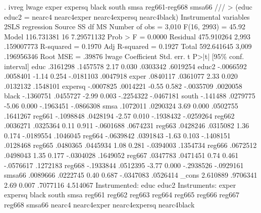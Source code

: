 . ivreg lwage exper expersq black south smsa reg661-reg668 smsa66 ///
> (educ educ2 = nearc4 nearc4exper nearc4expersq nearc4black)
{\smallskip}
Instrumental variables 2SLS regression
{\smallskip}
      Source {\VBAR}       SS           df       MS      Number of obs   =     3,010
   F(16, 2993)     =     45.92
       Model {\VBAR}  116.731381        16  7.29571132   Prob > F        =    0.0000
    Residual {\VBAR}  475.910264     2,993  .159007773   R-squared       =    0.1970
   Adj R-squared   =    0.1927
       Total {\VBAR}  592.641645     3,009  .196956346   Root MSE        =    .39876
{\smallskip}
       lwage {\VBAR} Coefficient  Std. err.      t    P>|t|     [95\% conf. interval]
        educ {\VBAR}   .3161298   .1457578     2.17   0.030     .0303342    .6019254
       educ2 {\VBAR}  -.0066592   .0058401    -1.14   0.254    -.0181103    .0047918
       exper {\VBAR}   .0840117   .0361077     2.33   0.020     .0132132    .1548101
     expersq {\VBAR}  -.0007825   .0014221    -0.55   0.582    -.0035709    .0020058
       black {\VBAR}  -.1360751   .0455727    -2.99   0.003    -.2254322   -.0467181
       south {\VBAR}   -.141488   .0279775    -5.06   0.000    -.1963451   -.0866308
        smsa {\VBAR}   .1072011   .0290324     3.69   0.000     .0502755    .1641267
      reg661 {\VBAR}  -.1098848   .0428194    -2.57   0.010    -.1938432   -.0259264
      reg662 {\VBAR}   .0036271   .0325364     0.11   0.911    -.0601688    .0674231
      reg663 {\VBAR}   .0428246   .0315082     1.36   0.174    -.0189554    .1046045
      reg664 {\VBAR}  -.0639842   .0391843    -1.63   0.103    -.1408151    .0128468
      reg665 {\VBAR}   .0480365   .0445934     1.08   0.281    -.0394003    .1354734
      reg666 {\VBAR}   .0672512   .0498043     1.35   0.177    -.0304028    .1649052
      reg667 {\VBAR}   .0347783   .0471451     0.74   0.461    -.0576617    .1272183
      reg668 {\VBAR}  -.1933844   .0512395    -3.77   0.000    -.2938526   -.0929161
      smsa66 {\VBAR}   .0089666   .0222745     0.40   0.687    -.0347083    .0526414
       _cons {\VBAR}   2.610889   .9706341     2.69   0.007     .7077116    4.514067
Instrumented: educ educ2
 Instruments: exper expersq black south smsa reg661 reg662 reg663 reg664
              reg665 reg666 reg667 reg668 smsa66 nearc4 nearc4exper
              nearc4expersq nearc4black
{\smallskip}
